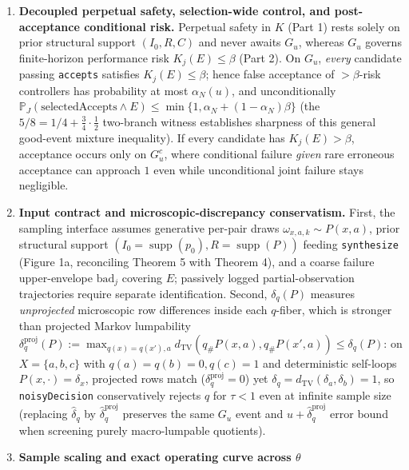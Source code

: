 \documentclass[11pt,a4paper]{article}
\providecommand{\tightlist}{\setlength{\itemsep}{2pt}\setlength{\parskip}{0pt}}
\begin{document}
\begin{enumerate}
\def\labelenumi{\arabic{enumi}.}
\tightlist
\item
  \textbf{Decoupled perpetual safety, selection-wide control, and
  post-acceptance conditional risk.} Perpetual safety in \(K\) (Part 1)
  rests solely on prior structural support \((I_0, R, C)\) and never
  awaits \(G_u\), whereas \(G_u\) governs finite-horizon performance
  risk \(K_j(E) \le \beta\) (Part 2). On \(G_u\), \emph{every} candidate
  passing \texttt{accepts} satisfies \(K_j(E) \le \beta\); hence false
  acceptance of \(> \beta\)-risk controllers has probability at most
  \(\alpha_N(u)\), and unconditionally
  \(\mathbb{P}_J(\mathrm{selectedAccepts} \land E) \le \min\{1, \alpha_N + (1-\alpha_N)\beta\}\)
  (the \(5/8 = 1/4 + \frac{3}{4}\cdot\frac{1}{2}\) two-branch witness
  establishes sharpness of this general good-event mixture inequality).
  If every candidate has \(K_j(E) > \beta\), acceptance occurs only on
  \(G_u^c\), where conditional failure \emph{given} rare erroneous
  acceptance can approach \(1\) even while unconditional joint failure
  stays negligible.
\item
  \textbf{Input contract and microscopic-discrepancy conservatism.}
  First, the sampling interface assumes generative per-pair draws
  \(\omega_{x,a,k} \sim P(x,a)\), prior structural support
  \((I_0 = \operatorname{supp}(p_0), R = \operatorname{supp}(P))\)
  feeding \texttt{synthesize} (Figure 1a, reconciling Theorem 5 with
  Theorem 4), and a coarse failure upper-envelope \(\mathrm{bad}_j\)
  covering \(E\); passively logged partial-observation trajectories
  require separate identification. Second, \(\delta_q(P)\) measures
  \emph{unprojected} microscopic row differences inside each
  \(q\)-fiber, which is stronger than projected Markov lumpability
  \(\delta_q^{\mathrm{proj}}(P) := \max_{q(x)=q(x'), a} d_{\mathrm{TV}}(q_\# P(x,a), q_\# P(x',a)) \le \delta_q(P)\):
  on \(X = \{a,b,c\}\) with \(q(a)=q(b)=0, q(c)=1\) and deterministic
  self-loops \(P(x,\cdot) = \delta_x\), projected rows match
  (\(\delta_q^{\mathrm{proj}} = 0\)) yet
  \(\delta_q = d_{\mathrm{TV}}(\delta_a, \delta_b) = 1\), so
  \texttt{noisyDecision} conservatively rejects \(q\) for \(\tau < 1\)
  even at infinite sample size (replacing \(\widehat{\delta}_q\) by
  \(\widehat{\delta}_q^{\mathrm{proj}}\) preserves the same \(G_u\)
  event and \(u + \widehat{\delta}_q^{\mathrm{proj}}\) error bound when
  screening purely macro-lumpable quotients).
\item
  \textbf{Sample scaling and exact operating curve across \(\theta\)
}
\end{enumerate}
\end{document}
